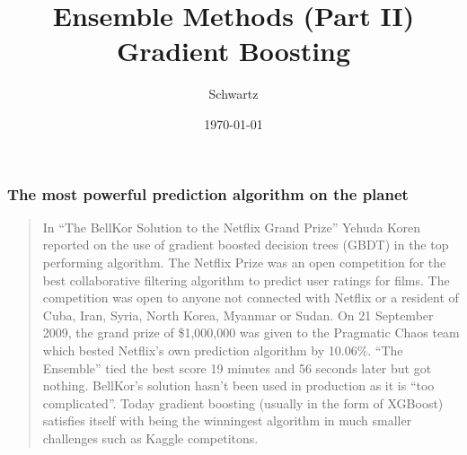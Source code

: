\documentclass[xcolor={dvipsnames}]{beamer}
\title{Ensemble Methods (Part II)\\
Gradient Boosting}
\author{Schwartz}
\date{\today}
\begin{document}
\frame{\titlepage}

\frame
{
 \frametitle{The most powerful prediction algorithm on the planet}

{
\selectfont
\begin{quote}
\tiny
\justify

In ``The BellKor Solution to the Netflix Grand Prize''
Yehuda Koren reported on the use of gradient boosted decision trees (GBDT) in the top performing algorithm.  
The Netflix Prize was an open competition for the best collaborative filtering algorithm to predict user ratings for films. The competition was open to anyone not connected with Netflix or a resident of Cuba, Iran, Syria, North Korea, Myanmar or Sudan. On 21 September 2009, the grand prize of \$1,000,000 was given to the Pragmatic Chaos team which bested Netflix's own prediction algorithm by 10.06\%.    ``The Ensemble''  tied  the best score 19 minutes and 56 seconds later but got nothing. 
BellKor's solution hasn't been used in production as it is ``too complicated''.  
Today gradient boosting (usually in the form of XGBoost) satisfies itself with being the winningest algorithm in  
much smaller challenges such as Kaggle competitons.
\end{quote}
}

\begin{figure}
\centering
{}
\end{figure}
}
\end{document}
